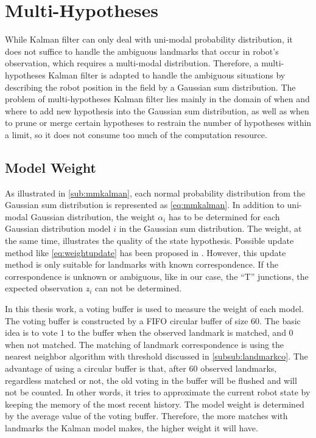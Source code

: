 \chapter{Multi-Hypotheses\label{cha:chapter5}}
While Kalman filter can only deal with uni-modal probability distribution, it does not suffice to handle the ambiguous landmarks that occur in robot's observation, which requires a multi-modal distribution. Therefore, a multi-hypotheses Kalman filter is adapted to handle the ambiguous situations by describing the robot position in the field by a Gaussian sum distribution.
The problem of multi-hypotheses Kalman filter lies mainly in the domain of when and where to add new hypothesis into the Gaussian sum distribution, as well as when to prune or merge certain hypotheses to restrain the number of hypotheses within a limit, so it does not consume too much of the computation resource.


\section{Model Weight}
As illustrated in \autoref{sub:mmkalman}, each normal probability distribution from the Gaussian sum distribution is represented as \autoref{eq:mmkalman}. In addition to uni-modal Gaussian distribution, the weight $\alpha_i$ has to be determined for each Gaussian distribution model $i$ in the Gaussian sum distribution. The weight, at the same time, illustrates the quality of the state hypothesis. Possible update method like \autoref{eq:weightupdate} has been proposed in \cite{alspach1972nonlinear}. However, this update method is only suitable for landmarks with known correspondence. If the correspondence is unknown or ambiguous, like in our case, the ``T'' junctions, the expected observation $z\widehat{}_i$ can not be determined. 

In this thesis work, a voting buffer is used to measure the weight of each model. The voting buffer is constructed by a \gls{FIFO} circular buffer of size $60$. The basic idea is to vote $1$ to the buffer when the observed landmark is matched, and $0$ when not matched. The matching of landmark correspondence is using the nearest neighbor algorithm with threshold discussed in \autoref{subsub:landmarkco}. 
The advantage of using a circular buffer is that, after $60$ observed landmarks, regardless matched or not, the old voting in the buffer will be flushed and will not be counted. In other words, it tries to approximate the current robot state by keeping the memory of the most recent history. The model weight is determined by the average value of the voting buffer. Therefore, the more matches with landmarks the Kalman model makes, the higher weight it will have. 

